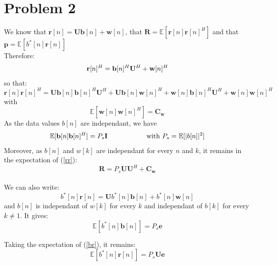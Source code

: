 \documentclass[a4paper]{article}
\begin{document}
\section{Problem 2}
We know that $\mathbf{r}[n]=\mathbf{Ub}[n]+\mathbf{w}[n]$, that $\mathbf{R}=\mathbb{E}[\mathbf{r}[n]{\mathbf{r}[n]}^H]$ and that $\mathbf{p}=\mathbb{E}[b^*[n]\mathbf{r}[n]]$\\
Therefore:
\begin{equation*}
\mathbf{r}[n]^H=\mathbf{b}[n]^H\mathbf{U}^H+\mathbf{w}[n]^H\\
\end{equation*}
so that:
\begin{equation}
\label{rr}
\mathbf{r}[n]\mathbf{r}[n]^H = \mathbf{U}\mathbf{b}[n]\mathbf{b}[n]^H\mathbf{U}^H + \mathbf{U}\mathbf{b}[n]\mathbf{w}[n]^H+\mathbf{w}[n]\mathbf{b}[n]^H\mathbf{U}^H+\mathbf{w}[n]\mathbf{w}[n]^H
\end{equation}
with
\begin{equation*}
\mathbb{E}[\mathbf{w}[n]\mathbf{w}[n]^H] = \mathbf{C_w}
\end{equation*}
As the data values $b[n]$ are independant, we have
\begin{equation*}
\mathbb{E}[\mathbf{b}[n]\mathbf{b}[n]^H] = P_s\mathbf{I}\text{\hspace{2cm}with } P_s=\mathbb{E}[|b[n]|^2]
\end{equation*}
Moreover, as $b[n]$ and $w[k]$ are independant for every $n$ and $k$, it remains in the expectation of (\ref{rr}): 
\begin{equation}
\mathbf{R}=P_s\mathbf{U}\mathbf{U}^H + \mathbf{C_w}
\end{equation}\\ 

We can also write:
\begin{equation}
\label{br}
b^*[n]\mathbf{r}[n]=\mathbf{U}b^*[n]\mathbf{b}[n] + b^*[n]\mathbf{w}[n]
\end{equation}
and $b[n]$ is independant of $w[k]$ for every $k$ and independant of $b[k]$ for every $k\ne1$. It gives:
\begin{equation*}
\mathbb{E}[b^*[n]\mathbf{b}[n]]=P_s\mathbf{e}
\end{equation*}

Taking the expectation of (\ref{br}), it remains:
\begin{equation}
\mathbb{E}[b^*[n]\mathbf{r}[n]]=P_s\mathbf{Ue}
\end{equation}

\newpage
\end{document}
